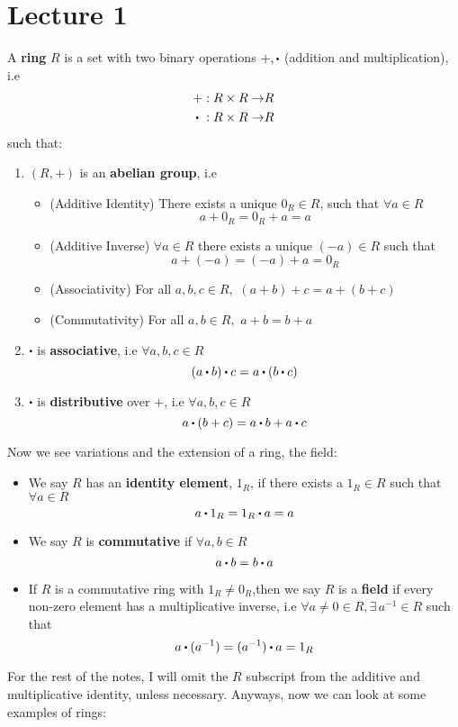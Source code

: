 \documentclass[../Main.tex]{subfiles}
\begin{document}
\chapter{Lecture 1}
\begin{dfn}[title= Rings and Fields]
	A \textbf{ring} $R$ is a set with two binary operations $+,\rdot$ (addition and multiplication), i.e 
	\begin{align*}
		+: R \times R \to &R \\
		\rdot \hspace{3pt}: R \times R \to &R 
	\end{align*}
such that:
\begin{enumerate}
	\item $(R,+)$ is an \textbf{abelian group}, i.e
	\begin{itemize}
		\item (Additive Identity) There exists a unique $0_R \in R$, such that $\forall a \in R$ \[a+0_R=0_R+a=a\]
		\item (Additive Inverse) $\forall a\in R$ there exists a unique $(-a) \in R$ such that
		\[a+(-a)=(-a)+a=0_R\]
		\item (Associativity) For all $a,b,c \in R, \,\, (a+b)+c=a+(b+c)$
		\item
		(Commutativity) For all $a,b\in R,\,\, a+b=b+a$
	\end{itemize} 
	\item $\rdot$ is \textbf{associative}, i.e  $\forall a,b,c\in R$
	\[(a\rdot b)\rdot c = a\rdot (b\rdot c)\]
	\item $\rdot$ is \textbf{distributive} over $+$, i.e $\forall a,b,c\in R$
	\[a\rdot(b+c)=a\rdot b+a\rdot c\]
\end{enumerate}
Now we see variations and the extension of a ring, the field:
\begin{itemize}
	\item We say $R$ has an \textbf{identity element}, $1_R$, if there exists a $1_R \in R$ such that $\forall a \in R$
	\[a\rdot 1_R =1_R \rdot a = a\]
	\item We say $R$ is \textbf{commutative} if $\forall a,b \in R$
	\[a\rdot b=b\rdot a\]	
	\item If $R$ is a commutative ring with $1_R \ne 0_R$,then we say $R$ is a \textbf{field} if every non-zero element has a multiplicative inverse, i.e $\forall a\ne0 \in R, \exists\, a^{-1}\in R$ such that
	\[ a\rdot(a^{-1})=(a^{-1})\rdot a = 1_R \]
\end{itemize}
\end{dfn}
For the rest of the notes, I will omit the $R$ subscript from the additive and multiplicative identity, unless necessary. Anyways, now we can look at some examples of rings:
\end{document}
